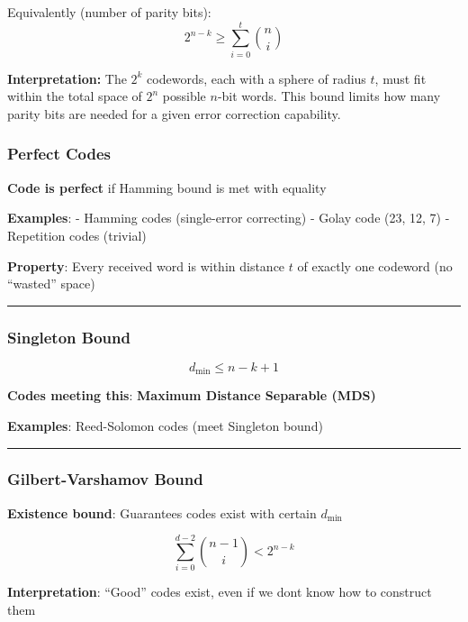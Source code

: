 Equivalently (number of parity bits):
\begin{equation}
2^{n-k} \geq \sum_{i=0}^{t} \binom{n}{i}
\label{eq:hamming-bound-parity}
\end{equation}

\textbf{Interpretation:} The $2^k$ codewords, each with a sphere of radius $t$, must fit within the total space of $2^n$ possible $n$-bit words. This bound limits how many parity bits are needed for a given error correction capability.

\subsubsection{Perfect Codes}\label{perfect-codes}

\textbf{Code is perfect} if Hamming bound is met with equality

\textbf{Examples}: - Hamming codes (single-error correcting) - Golay
code (23, 12, 7) - Repetition codes (trivial)

\textbf{Property}: Every received word is within distance \(t\) of
exactly one codeword (no ``wasted'' space)

\begin{center}\rule{0.5\linewidth}{0.5pt}\end{center}

\subsubsection{Singleton Bound}\label{singleton-bound}

\[
d_{\min} \leq n - k + 1
\]

\textbf{Codes meeting this}: \textbf{Maximum Distance Separable (MDS)}

\textbf{Examples}: Reed-Solomon codes (meet Singleton bound)

\begin{center}\rule{0.5\linewidth}{0.5pt}\end{center}

\subsubsection{Gilbert-Varshamov Bound}\label{gilbert-varshamov-bound}

\textbf{Existence bound}: Guarantees codes exist with certain
\(d_{\min}\)

\[
\sum_{i=0}^{d-2} \binom{n-1}{i} < 2^{n-k}
\]

\textbf{Interpretation}: ``Good'' codes exist, even if we
don\textquotesingle t know how to construct them

